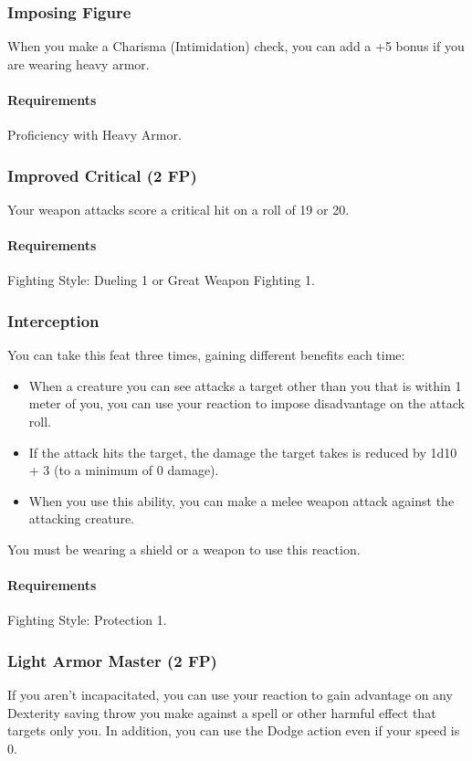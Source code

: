 \subsubsection{Imposing Figure} \label{feat::imposingfigure}
    When you make a Charisma (Intimidation) check, you can add a +5 bonus if you are wearing heavy armor.
    \paragraph{Requirements} Proficiency with Heavy Armor.
\subsubsection{Improved Critical (2 FP)} \label{feat::improvedcritical}
    Your weapon attacks score a critical hit on a roll of 19 or 20.
    \paragraph{Requirements} Fighting Style: Dueling 1 or Great Weapon Fighting 1.
\subsubsection{Interception} \label{feat::interception}
    You can take this feat three times, gaining different benefits each time:
    \begin{itemize}
        \item When a creature you can see attacks a target other than you that is within 1 meter of you, you can use your reaction to impose disadvantage on the attack roll.
        \item If the attack hits the target, the damage the target takes is reduced by 1d10 + 3 (to a minimum of 0 damage).
        \item When you use this ability, you can make a melee weapon attack against the attacking creature.
    \end{itemize}
    You must be wearing a shield or a weapon to use this reaction.
    \paragraph{Requirements} Fighting Style: Protection 1.
\subsubsection{Light Armor Master (2 FP)} \label{feat::lightarmormaster}
    If you aren't incapacitated, you can use your reaction to gain advantage on any Dexterity saving throw you make against a spell or other harmful effect that targets only you.
    In addition, you can use the Dodge action even if your speed is 0.

